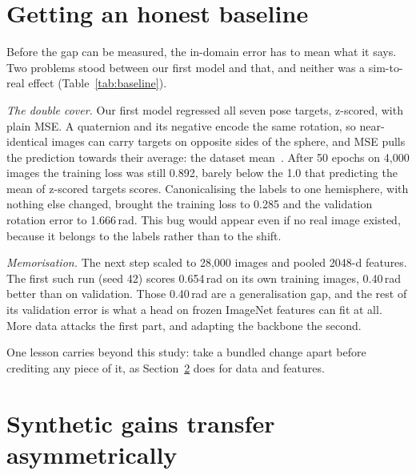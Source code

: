 \documentclass{article}
\begin{document}
\section{Getting an honest baseline}
\label{sec:baseline}

Before the gap can be measured, the in-domain error has to mean what it says. Two problems
stood between our first model and that, and neither was a sim-to-real effect
(Table~\ref{tab:baseline}).

\emph{The double cover.} Our first model regressed all seven pose targets, z-scored, with
plain MSE. A quaternion and its negative encode the same rotation, so near-identical images
can carry targets on opposite sides of the sphere, and MSE pulls the prediction towards their
average: the dataset mean~\citep{zhou2019continuity}. After 50 epochs on 4{,}000 images the
training loss was still 0.892, barely below the 1.0 that predicting the mean of z-scored
targets scores. Canonicalising the labels to one hemisphere, with nothing else changed,
brought the training loss to 0.285 and the validation rotation error to 1.666\,rad. This bug
would appear even if no real image existed, because it belongs to the labels rather than to
the shift.

\emph{Memorisation.} The next step scaled to 28{,}000 images and pooled 2048-d features. The
first such run (seed 42) scores 0.654\,rad on its own training images, 0.40\,rad better than on
validation. Those 0.40\,rad are a generalisation gap, and the rest of its validation error is
what a head on frozen ImageNet features can fit at all. More data attacks the first part, and
adapting the backbone the second.

One lesson carries beyond this study: take a bundled change apart before crediting any piece
of it, as Section~\ref{sec:asymmetry} does for data and features.



\section{Synthetic gains transfer asymmetrically}
\label{sec:asymmetry}


\end{document}
